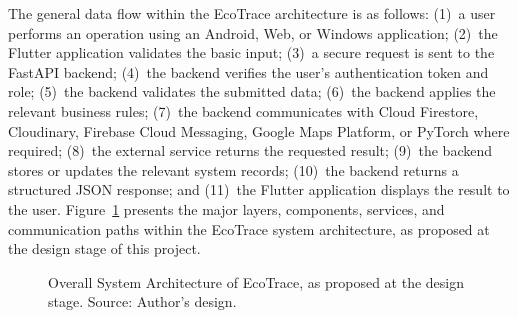 The general data flow within the EcoTrace architecture is as follows:
(1)~a user performs an operation using an Android, Web, or Windows
application; (2)~the Flutter application validates the basic input; (3)~a secure
request is sent to the FastAPI backend; (4)~the backend verifies the user's
authentication token and role; (5)~the backend validates the submitted data;
(6)~the backend applies the relevant business rules; (7)~the backend
communicates with Cloud Firestore, Cloudinary, Firebase Cloud Messaging,
Google Maps Platform, or PyTorch where required; (8)~the external service
returns the requested result; (9)~the backend stores or updates the relevant
system records; (10)~the backend returns a structured JSON response; and
(11)~the Flutter application displays the result to the user.
Figure~\ref{fig:system-architecture} presents the major layers, components,
services, and communication paths within the EcoTrace system architecture, as
proposed at the design stage of this project.

\begin{figure}[H]
  \centering
  \caption{Overall System Architecture of EcoTrace, as proposed at the design stage. Source: Author's design.}
  \label{fig:system-architecture}
\end{figure}

